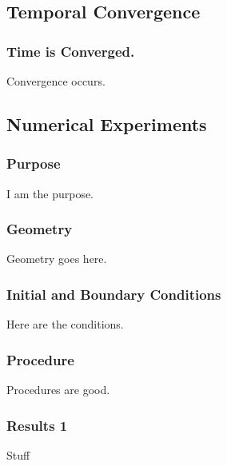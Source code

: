 \documentclass[compress]{beamer}
\begin{document}
\subsection[Convergence]{Temporal Convergence}
\begin{frame}
\frametitle{Time is Converged.}

Convergence occurs.

\end{frame}
\subsection[Experiments]{Numerical Experiments}
\begin{frame}
\frametitle{Purpose}

I am the purpose.

\end{frame}
\begin{frame}
\frametitle{Geometry}

Geometry goes here.

\end{frame}
\begin{frame}
\frametitle{Initial and Boundary Conditions}

Here are the conditions.

\end{frame}
\begin{frame}
\frametitle{Procedure}

Procedures are good.

\end{frame}
\begin{frame}
\frametitle{Results 1}

Stuff

\end{frame}
\end{document}
